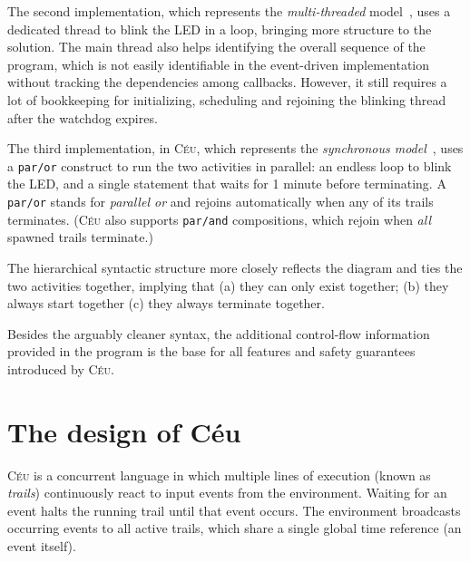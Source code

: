 \documentclass[10pt]{sensys-proc}
\newcommand{\CEU}{\textsc{C\'{e}u}\xspace}
\newcommand{\code}[1] {{\small{\texttt{#1}}}}
\begin{document}
The second implementation, which represents the \emph{multi-threaded} 
model~\cite{wsn.protothreads,wsn.mantisos}, uses a dedicated thread to blink 
the LED in a loop, bringing more structure to the solution.
The main thread also helps identifying the overall sequence of the program, 
which is not easily identifiable in the event-driven implementation without 
tracking the dependencies among callbacks.
However, it still requires a lot of bookkeeping for initializing, scheduling 
and rejoining the blinking thread after the watchdog expires.


The third implementation, in \CEU, which represents the \emph{synchronous 
model}~\cite{wsn.osm,wsn.sol}, uses a \code{par/or} construct to run the two 
activities in parallel:
an endless loop to blink the LED, and a single statement that waits for 1 
minute before terminating.
A \code{par/or} stands for \emph{parallel or} and rejoins automatically when 
any of its trails terminates.
(\CEU also supports \code{par/and} compositions, which rejoin when \emph{all} 
spawned trails terminate.)

The hierarchical syntactic structure more closely reflects the diagram and ties 
the two activities together, implying that
(a) they can only exist together;
(b) they always start together
(c) they always terminate together.

Besides the arguably cleaner syntax, the additional control-flow information 
provided in the program is the base for all features and safety guarantees 
introduced by \CEU.


\section{The design of C\'eu}
\label{sec.ceu}

\CEU{} is a concurrent language in which multiple lines of execution (known as 
\emph{trails}) continuously react to input events from the environment.
Waiting for an event halts the running trail until that event occurs.
The environment broadcasts occurring events to all active trails, which share a 
single global time reference (an event itself).

\end{document}
